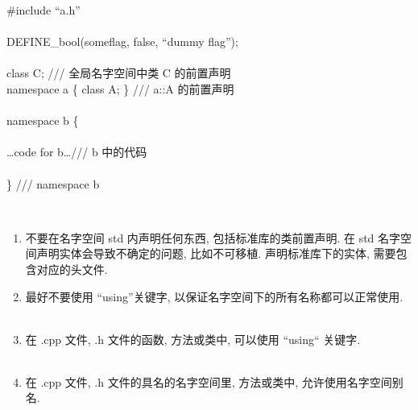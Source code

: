 \documentclass[a4paper,11pt,CJK]{article}
\begin{document}
\begin{CJK}{UTF8}{gbsn}
{\begin{minipage}{400pt}
\indent \#include ``a.h''\\
\\
\indent DEFINE\_bool(someflag, false, ``dummy flag'');\\
\\
\indent class C;                    /// 全局名字空间中类 C 的前置声明\\
\indent namespace a \{ class A; \}    /// a::A 的前置声明\\
\indent \\
\indent namespace b \{\\
\indent \\
\indent \dots code for b\dots                /// b 中的代码\\
\\
\indent \} /// namespace b
\end{minipage}
}
\\
\begin{enumerate}
    \item 不要在名字空间 std 内声明任何东西, 包括标准库的类前置声明. 在 std 名字空间声明实体会导致不确定的问题, 比如不可移植. 声明标准库下的实体, 需要包含对应的头文件.
    \item 最好不要使用 ``using''关键字, 以保证名字空间下的所有名称都可以正常使用.\\
        \\
    \noindent
    \item 在 .cpp 文件, .h 文件的函数, 方法或类中, 可以使用 ``using`` 关键字.\\
        \\
    \noindent
    \item 在 .cpp 文件, .h 文件的具名的名字空间里, 方法或类中, 允许使用名字空间别名.\\
    \\
    \noindent
\end{enumerate}
\end{CJK}
\end{document}
